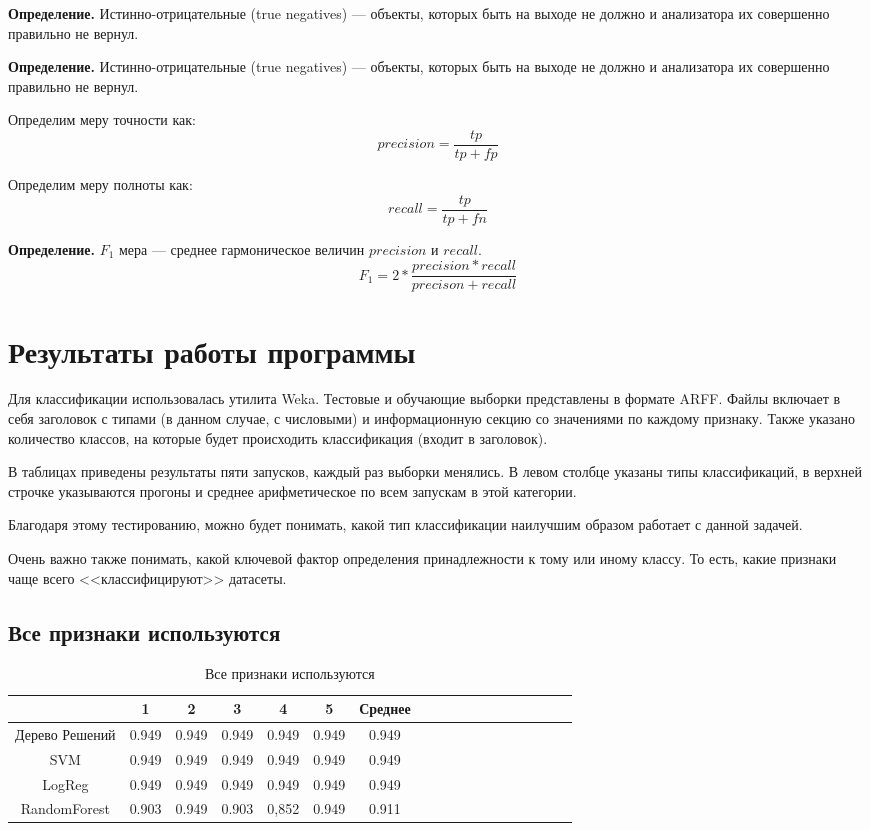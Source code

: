 \textbf{Определение.} Истинно-отрицательные (true negatives) --- объекты, которых быть на выходе не должно и анализатора их совершенно правильно не вернул.

\textbf{Определение.} Истинно-отрицательные (true negatives) --- объекты, которых быть на выходе не должно и анализатора их совершенно правильно не вернул.

Определим меру точности как:
\[precision = \frac{tp}{tp+ fp}\]

Определим меру полноты как:
\[recall = \frac{tp}{tp+ fn}\]

\textbf{Определение.}  $F_1$ мера --- среднее гармоническое величин
$precision$  и $recall$.
\[F_1 = 2 * \frac{precision*recall}{precison+ recall}\]


\section{Результаты работы программы}

Для классификации использовалась утилита Weka. Тестовые и обучающие выборки представлены в формате ARFF.
Файлы включает в себя заголовок с типами (в данном случае, с числовыми) и информационную секцию со значениями по каждому признаку.
Также указано количество классов, на которые будет происходить классификация (входит в заголовок).

В таблицах приведены результаты пяти запусков, каждый раз выборки менялись.
В левом столбце указаны типы классификаций, в верхней строчке указываются прогоны и среднее арифметическое по всем запускам в этой категории.

Благодаря этому тестированию, можно будет понимать, какой тип классификации наилучшим образом работает с данной задачей.

Очень важно также  понимать, какой ключевой фактор определения принадлежности к тому или иному классу.
То есть, какие признаки чаще всего <<классифицируют>> датасеты.

\subsection{Все признаки используются}
 
\begin{table}[!h]
	\centering
	\caption{Все признаки используются}\label{tab1}
	\begin{tabu}{|*{18}{c|}}\hline
		    &  1  & 2 & 3 & 4 & 5 & Среднее \\\hline
		Дерево Решений & 0.949 & 0.949 & 0.949  & 0.949 & 0.949 & 0.949 \\\hline
		SVM &  0.949 & 0.949 & 0.949  & 0.949 & 0.949 & 0.949 \\\hline
		LogReg & 0.949 & 0.949 & 0.949  & 0.949 & 0.949 & 0.949  \\\hline
		RandomForest &0.903 & 0.949 & 0.903 &  0,852  & 0.949 & 0.911 \\\hline
	\end{tabu}
\end{table}

